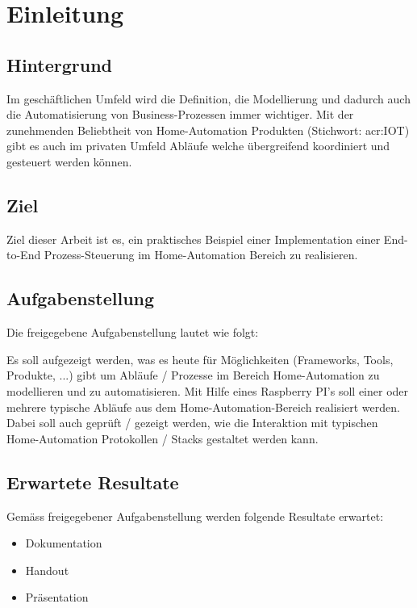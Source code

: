 
\chapter{Einleitung}

\section{Hintergrund}
Im geschäftlichen Umfeld wird die Definition, die Modellierung und dadurch auch
die Automatisierung von Business-Prozessen immer wichtiger. Mit der
zunehmenden Beliebtheit von Home-Automation Produkten (Stichwort: \gls{acr:IOT}) gibt es auch im privaten Umfeld Abläufe welche übergreifend koordiniert
und gesteuert werden können.

\section{Ziel}
Ziel dieser Arbeit ist es, ein praktisches Beispiel einer Implementation einer
End-to-End Prozess-Steuerung im Home-Automation Bereich zu realisieren.

\section{Aufgabenstellung} \label{sec:Aufgabenstellung}
Die freigegebene Aufgabenstellung lautet wie folgt:

Es soll aufgezeigt werden, was es heute für Möglichkeiten (Frameworks, Tools,
Produkte, ...) gibt um Abläufe / Prozesse im Bereich Home-Automation zu
modellieren und zu automatisieren. Mit Hilfe eines Raspberry PI's soll einer oder
mehrere typische Abläufe aus dem Home-Automation-Bereich realisiert werden.
Dabei soll auch geprüft / gezeigt werden, wie die Interaktion mit typischen
Home-Automation Protokollen / Stacks gestaltet werden kann.


\section{Erwartete Resultate} \label{sec:ErwarteteResultate}
Gemäss freigegebener Aufgabenstellung werden folgende Resultate erwartet:

\begin{itemize}
\item Dokumentation
\item Handout
\item Präsentation
\end{itemize}


